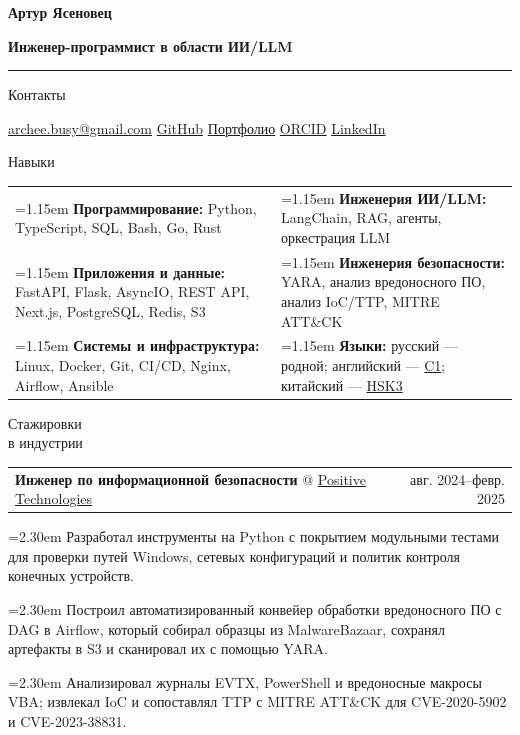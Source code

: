 \documentclass[11pt,a4paper]{article}
\makeatletter
\newcommand{\cvrow}[2]{%
  \noindent
  \begin{minipage}[t]{0.145\textwidth}
    \vspace{0pt}%
    \raggedright
    \fontsize{10.5}{12.5}\selectfont
    #1
  \end{minipage}%
  \hfill
  \begin{minipage}[t]{0.835\textwidth}
    \vspace{0pt}%
    #2
  \end{minipage}\par
}
\newcommand{\skillcell}[2]{%
  \noindent
  \hangindent=1.15em
  \hangafter=1
  \makebox[1.15em][l]{$\diamond$}%
  \textbf{#1} #2%
}
\newcommand{\workentry}[2]{%
  \noindent
  \begin{tabularx}{\linewidth}
    {@{}X@{\hspace{0.8em}}r@{}}
    #1 & \small #2
  \end{tabularx}\par
  \vspace{0.15em}
}
\newcommand{\workproject}[1]{%
  \noindent
  \hangindent=2.30em
  \hangafter=1
  \hspace*{1.15em}\makebox[1.15em][l]{$\diamond$}#1\par
  \vspace{0.12em}
}
\makeatother
\begin{document}
{\fontsize{24}{28}\selectfont\bfseries Артур Ясеновец}\par
\vspace{0.08em}
{\large\bfseries Инженер-программист в области ИИ/LLM}\par
\vspace{0.22em}
\hrule
\vspace{0.55em}

\cvrow{Контакты}{%
  \href{mailto:archee.busy@gmail.com}{archee.busy@gmail.com}
  \;\textbullet\;
  \href{https://github.com/iasenovets}{GitHub}
  \;\textbullet\;
  \href{https://iasenovets.github.io/}{Портфолио}
  \;\textbullet\;
  \href{https://orcid.org/0009-0008-0008-3746}{ORCID}
  \;\textbullet\;
  \href{https://linkedin.com/in/iasenovets}{LinkedIn}
}

\vspace{0.55em}

\cvrow{Навыки}{%
  \begin{tabularx}{\linewidth}
    {@{}>{\raggedright\arraybackslash}X
    @{\hspace{1.2em}}
    >{\raggedright\arraybackslash}X@{}}

    \skillcell{Программирование:}{%
      Python, TypeScript, SQL, Bash, Go, Rust}
    &
    \skillcell{Инженерия ИИ/LLM:}{%
      LangChain, RAG, агенты,
      оркестрация LLM}
    \\[0.20em]

    \skillcell{Приложения и данные:}{%
      FastAPI, Flask, AsyncIO, REST API,
      Next.js, PostgreSQL, Redis, S3}
    &
    \skillcell{Инженерия безопасности:}{%
      YARA, анализ вредоносного ПО, анализ IoC/TTP,
      MITRE ATT\&CK}
    \\[0.20em]

    \skillcell{Системы и инфраструктура:}{%
      Linux, Docker, Git, CI/CD, Nginx,
      Airflow, Ansible}
    &
    \skillcell{Языки:}{%
      русский --- родной;
      английский --- \href{https://iasenovets.github.io/files/toefl_8cd5f4a2b8ec8f34da49ea0faeef43f1.pdf}{C1};
      китайский --- \href{https://admin.chinesetest.cn/queryScore.do?sid=c2tActR9Wb\%2704b861aefbdc5e9fd0b44afa717d08cbceb0720e582ce25f\%2724d7sWsQ5nVUQSwD}{HSK3}}
  \end{tabularx}
}

\vspace{0.75em}

\cvrow{Стажировки\\в индустрии}{%
  \workentry
    {\textbf{Инженер по информационной безопасности} @
    \href{https://global.ptsecurity.com/en/}{Positive Technologies}}
    {авг. 2024--февр. 2025}

  \workproject{Разработал инструменты на Python с покрытием модульными тестами
  для проверки путей Windows, сетевых конфигураций и политик контроля
  конечных устройств.}
  \workproject{Построил автоматизированный конвейер обработки вредоносного ПО
  с DAG в Airflow, который собирал образцы из MalwareBazaar, сохранял
  артефакты в S3 и сканировал их с помощью YARA.}
  \workproject{Анализировал журналы EVTX, PowerShell и вредоносные макросы VBA;
  извлекал IoC и сопоставлял TTP с MITRE ATT\&CK для CVE-2020-5902
  и CVE-2023-38831.}
}
\end{document}
